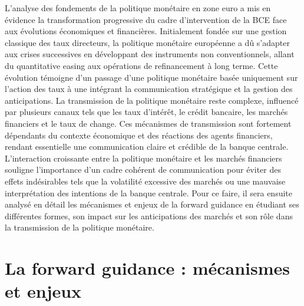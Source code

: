L’analyse des fondements de la politique monétaire en zone euro a mis en évidence la transformation progressive du cadre d’intervention de la BCE face aux évolutions économiques et financières. Initialement fondée sur une gestion classique des taux directeurs, la politique monétaire européenne a dû s’adapter aux crises successives en développant des instruments non conventionnels, allant du quantitative easing aux opérations de refinancement à long terme. Cette évolution témoigne d’un passage d’une politique monétaire basée uniquement sur l’action des taux à une intégrant la communication stratégique et la gestion des anticipations. La transmission de la politique monétaire reste complexe, influencé par plusieurs canaux tels que les taux d’intérêt, le crédit bancaire, les marchés financiers et le taux de change. Ces mécanismes de transmission sont fortement dépendants du contexte économique et des réactions des agents financiers, rendant essentielle une communication claire et crédible de la banque centrale. L’interaction croissante entre la politique monétaire et les marchés financiers souligne l'importance d’un cadre cohérent de communication pour éviter des effets indésirables tels que la volatilité excessive des marchés ou une mauvaise interprétation des intentions de la banque centrale. Pour ce faire, il sera ensuite analysé en détail les mécanismes et enjeux de la forward guidance en étudiant ses différentes formes, son impact sur les anticipations des marchés et son rôle dans la transmission de la politique monétaire.


\section{La forward guidance : mécanismes et enjeux}

